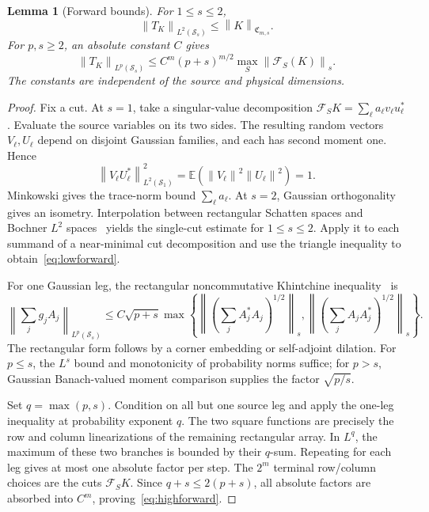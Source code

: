 \documentclass[11pt,a4paper]{amsart}
\numberwithin{equation}{section}
\newtheorem{lemma}[theorem]{Lemma}
\theoremstyle{definition}
\theoremstyle{remark}
\newcommand{\E}{\mathbb E}
\newcommand{\Sch}{\mathcal S}
\newcommand{\Coeff}{\mathfrak C}
\newcommand{\Flat}{\mathcal F}
\newcommand{\norm}[1]{\left\lVert#1\right\rVert}
\begin{document}
\begin{lemma}[Forward bounds]\label{lem:forward}
For $1\le s\le2$,
\begin{equation}\label{eq:lowforward}
 \norm{T_K}_{L^2(\Sch_s)}\le\norm K_{\Coeff_{m,s}}.
\end{equation}
For $p,s\ge2$, an absolute constant $C$ gives
\begin{equation}\label{eq:highforward}
 \norm{T_K}_{L^p(\Sch_s)}
 \le C^m(p+s)^{m/2}\max_S\norm{\Flat_S(K)}_s.
\end{equation}
The constants are independent of the source and physical dimensions.
\end{lemma}
\begin{proof}
Fix a cut. At $s=1$, take a singular-value decomposition
$\Flat_SK=\sum_\ell a_\ell v_\ell u_\ell^*$.
Evaluate the source variables on its two sides. The resulting random vectors $V_\ell,U_\ell$ depend on disjoint Gaussian families, and each has second moment one. Hence
\[
 \norm{V_\ell U_\ell^*}_{L^2(\Sch_1)}^2
 =\E(\norm{V_\ell}^2\norm{U_\ell}^2)=1.
\]
Minkowski gives the trace-norm bound $\sum_\ell a_\ell$. At $s=2$, Gaussian orthogonality gives an isometry. Interpolation between rectangular Schatten spaces and Bochner $L^2$ spaces~\cite{BL} yields the single-cut estimate for $1\le s\le2$. Apply it to each summand of a near-minimal cut decomposition and use the triangle inequality to obtain~\eqref{eq:lowforward}.

For one Gaussian leg, the rectangular noncommutative Khintchine inequality~\cite{LP,Buchholz} is
\[
 \left\|\sum_jg_jA_j\right\|_{L^p(\Sch_s)}
 \le C\sqrt{p+s}\max\left\{
 \left\|(\sum_jA_j^*A_j)^{1/2}\right\|_s,
 \left\|(\sum_jA_jA_j^*)^{1/2}\right\|_s\right\}.
\]
The rectangular form follows by a corner embedding or self-adjoint dilation. For $p\le s$, the $L^s$ bound and monotonicity of probability norms suffice; for $p>s$, Gaussian Banach-valued moment comparison supplies the factor $\sqrt{p/s}$.

Set $q=\max(p,s)$. Condition on all but one source leg and apply the one-leg inequality at probability exponent $q$. The two square functions are precisely the row and column linearizations of the remaining rectangular array. In $L^q$, the maximum of these two branches is bounded by their $q$-sum. Repeating for each leg gives at most one absolute factor per step. The $2^m$ terminal row/column choices are the cuts $\Flat_SK$. Since $q+s\le2(p+s)$, all absolute factors are absorbed into $C^m$, proving~\eqref{eq:highforward}.
\end{proof}
\end{document}
